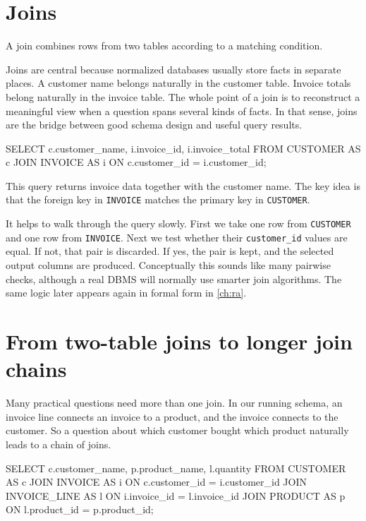 \documentclass[11pt,a4paper,openany]{book}
\begin{document}
\section{Joins}
A join combines rows from two tables according to a matching condition.

Joins are central because normalized databases usually store facts in separate places. A customer name belongs naturally in the customer table. Invoice totals belong naturally in the invoice table. The whole point of a join is to reconstruct a meaningful view when a question spans several kinds of facts. In that sense, joins are the bridge between good schema design and useful query results.

\begin{codesql}
SELECT c.customer_name, i.invoice_id, i.invoice_total
FROM CUSTOMER AS c
JOIN INVOICE AS i
  ON c.customer_id = i.customer_id;
\end{codesql}

This query returns invoice data together with the customer name. The key idea is that the foreign key in \texttt{INVOICE} matches the primary key in \texttt{CUSTOMER}.

It helps to walk through the query slowly. First we take one row from \texttt{CUSTOMER} and one row from \texttt{INVOICE}. Next we test whether their \texttt{customer\_id} values are equal. If not, that pair is discarded. If yes, the pair is kept, and the selected output columns are produced. Conceptually this sounds like many pairwise checks, although a real DBMS will normally use smarter join algorithms. The same logic later appears again in formal form in \cref{ch:ra}.

\section{From two-table joins to longer join chains}
Many practical questions need more than one join. In our running schema, an invoice line connects an invoice to a product, and the invoice connects to the customer. So a question about which customer bought which product naturally leads to a chain of joins.

\begin{codesql}
SELECT c.customer_name, p.product_name, l.quantity
FROM CUSTOMER AS c
JOIN INVOICE AS i
  ON c.customer_id = i.customer_id
JOIN INVOICE_LINE AS l
  ON i.invoice_id = l.invoice_id
JOIN PRODUCT AS p
  ON l.product_id = p.product_id;
\end{codesql}
\end{document}

